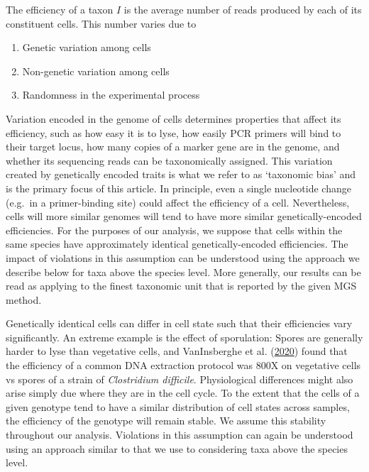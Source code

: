 \documentclass[
]{article}
\providecommand{\tightlist}{%
  \setlength{\itemsep}{0pt}\setlength{\parskip}{0pt}}
\begin{document}
The efficiency of a taxon \(I\) is the average number of reads produced by each of its constituent cells.
This number varies due to

\begin{enumerate}
\def\labelenumi{\arabic{enumi}.}
\tightlist
\item
  Genetic variation among cells
\item
  Non-genetic variation among cells
\item
  Randomness in the experimental process
\end{enumerate}

Variation encoded in the genome of cells determines properties that affect its efficiency, such as how easy it is to lyse, how easily PCR primers will bind to their target locus, how many copies of a marker gene are in the genome, and whether its sequencing reads can be taxonomically assigned.
This variation created by genetically encoded traits is what we refer to as `taxonomic bias' and is the primary focus of this article.
In principle, even a single nucleotide change (e.g.~in a primer-binding site) could affect the efficiency of a cell.
Nevertheless, cells will more similar genomes will tend to have more similar genetically-encoded efficiencies.
For the purposes of our analysis, we suppose that cells within the same species have approximately identical genetically-encoded efficiencies.
The impact of violations in this assumption can be understood using the approach we describe below for taxa above the species level.
More generally, our results can be read as applying to the finest taxonomic unit that is reported by the given MGS method.

Genetically identical cells can differ in cell state such that their efficiencies vary significantly.
An extreme example is the effect of sporulation: Spores are generally harder to lyse than vegetative cells, and VanInsberghe et al. (\protect\hyperlink{ref-vaninsberghe2020diar}{2020}) found that the efficiency of a common DNA extraction protocol was 800X on vegetative cells vs spores of a strain of \emph{Clostridium difficile}.
Physiological differences might also arise simply due where they are in the cell cycle.
To the extent that the cells of a given genotype tend to have a similar distribution of cell states across samples, the efficiency of the genotype will remain stable.
We assume this stability throughout our analysis.
Violations in this assumption can again be understood using an approach similar to that we use to considering taxa above the species level.
\end{document}
